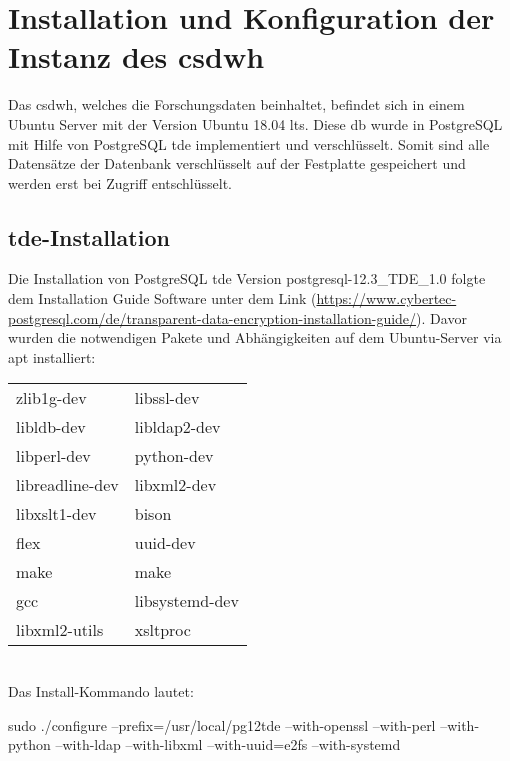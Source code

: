 \chapter{Installation und Konfiguration der Instanz des \acs{csdwh}}
    
    Das \ac{csdwh}, welches die Forschungsdaten beinhaltet, befindet sich in einem Ubuntu Server mit der Version Ubuntu 18.04 \ac{lts}. Diese \ac{db} wurde in PostgreSQL mit Hilfe von PostgreSQL \ac{tde} implementiert und verschlüsselt. Somit sind alle Datensätze der Datenbank verschlüsselt auf der Festplatte gespeichert und werden erst bei Zugriff entschlüsselt.
    
    \section{\acs{tde}-Installation}    
    
    Die Installation von PostgreSQL \ac{tde} Version postgresql-12.3\_TDE\_1.0 folgte dem Installation Guide Software unter dem Link  (\url{https://www.cybertec-postgresql.com/de/transparent-data-encryption-installation-guide/}). Davor wurden die notwendigen Pakete und Abhängigkeiten auf dem Ubuntu-Server via \textsf{apt} installiert:
    
    \begin{tabular}{ll}
    	\textsf{zlib1g-dev} & \textsf{libssl-dev} \\ 
    	\textsf{libldb-dev} & \textsf{libldap2-dev} \\
    	\textsf{libperl-dev} & \textsf{python-dev} \\
    	\textsf{libreadline-dev} & \textsf{libxml2-dev} \\
    	\textsf{libxslt1-dev} & \textsf{bison} \\
    	\textsf{flex} & \textsf{uuid-dev} \\
    	\textsf{make} & \textsf{make} \\
    	\textsf{gcc} & \textsf{libsystemd-dev} \\
    	\textsf{libxml2-utils} & \textsf{xsltproc} \\
    \end{tabular} \\
    
    Das Install-Kommando lautet: 
           
    sudo ./configure --prefix=/usr/local/pg12tde --with-openssl --with-perl --with-python --with-ldap --with-libxml --with-uuid=e2fs --with-systemd\\ \\
    
